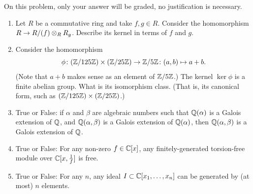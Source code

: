 \begin{question}[subtitle=January 2023 Problem 1,ID=Jan23_1]
On this problem, only your answer will be graded, no justification is necessary.
\begin{enumerate}
    \item Let $R$ be a commutative ring and take $f,g \in R$. Consider the homomorphism \mbox{$R \to R/(f) \otimes_R R_g$.} Describe its kernel in terms of $f$ and $g$.
    \item Consider the homomorphism
    \[\phi\colon (\mathbb{Z}/125\mathbb{Z}) \times (\mathbb{Z}/25\mathbb{Z}) \to \mathbb{Z}/5\mathbb{Z}\colon (a,b) \mapsto a+b.\]
    (Note that $a+b$ makes sense as an element of $\mathbb{Z}/5\mathbb{Z}$.) The kernel $\ker \phi$ is a finite abelian group. What is its isomorphism class. (That is, its canonical form, such as $(\mathbb{Z}/125\mathbb{Z}) \times (\mathbb{Z}/25\mathbb{Z})$.)
    \item True or False: if $\alpha$ and $\beta$ are algebraic numbers such that $\mathbb{Q}(\alpha)$ is a Galois extension of $\mathbb{Q}$, and $\mathbb{Q}(\alpha,\beta)$ is a Galois extension of $\mathbb{Q}(\alpha)$, then $\mathbb{Q}(\alpha,\beta)$ is a Galois extension of $\mathbb{Q}$.
    \item True or False: For any non-zero $f \in \mathbb{C}[x]$, any finitely-generated torsion-free module over $\mathbb{C}[x,\frac{1}{f}]$ is free.
    \item True or False: For any $n$, any ideal $I \subset \mathbb{C}[x_1,\dots,x_n]$ can be generated by (at most) $n$ elements.
\end{enumerate}
\end{question}
